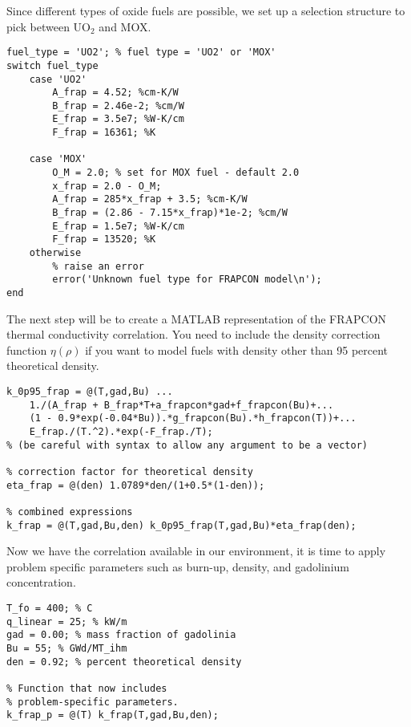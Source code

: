 Since different types of oxide fuels are possible, we set up a selection structure to pick between UO$_{2}$ and MOX.
\begin{lstlisting}[caption=Step 1 continued.]
% set constants based on fuel type.
fuel_type = 'UO2'; % fuel type = 'UO2' or 'MOX'
switch fuel_type
    case 'UO2'
        A_frap = 4.52; %cm-K/W
        B_frap = 2.46e-2; %cm/W
        E_frap = 3.5e7; %W-K/cm
        F_frap = 16361; %K
       
    case 'MOX'
        O_M = 2.0; % set for MOX fuel - default 2.0
        x_frap = 2.0 - O_M;
        A_frap = 285*x_frap + 3.5; %cm-K/W
        B_frap = (2.86 - 7.15*x_frap)*1e-2; %cm/W
        E_frap = 1.5e7; %W-K/cm
        F_frap = 13520; %K
    otherwise
        % raise an error
        error('Unknown fuel type for FRAPCON model\n');
end
\end{lstlisting}

The next step will be to create a MATLAB representation of the FRAPCON thermal conductivity correlation.  You need to include the density correction function $\eta(\rho)$ if you want to model fuels with density other than 95 percent theoretical density.

\begin{lstlisting}[caption=MATLAB function for the FRAPCON correlation.]
% equation 8.22a
k_0p95_frap = @(T,gad,Bu) ...
    1./(A_frap + B_frap*T+a_frapcon*gad+f_frapcon(Bu)+...
    (1 - 0.9*exp(-0.04*Bu)).*g_frapcon(Bu).*h_frapcon(T))+...
    E_frap./(T.^2).*exp(-F_frap./T);
% (be careful with syntax to allow any argument to be a vector)

% correction factor for theoretical density
eta_frap = @(den) 1.0789*den/(1+0.5*(1-den));

% combined expressions
k_frap = @(T,gad,Bu,den) k_0p95_frap(T,gad,Bu)*eta_frap(den);

\end{lstlisting}

Now we have the correlation available in our environment, it is time to apply problem specific parameters such as burn-up, density, and gadolinium concentration.

\begin{lstlisting}[caption=Apply problem-specific parameters.]
%% Given Parameters
T_fo = 400; % C
q_linear = 25; % kW/m
gad = 0.00; % mass fraction of gadolinia
Bu = 55; % GWd/MT_ihm
den = 0.92; % percent theoretical density

% Function that now includes
% problem-specific parameters.
k_frap_p = @(T) k_frap(T,gad,Bu,den);

\end{lstlisting}

